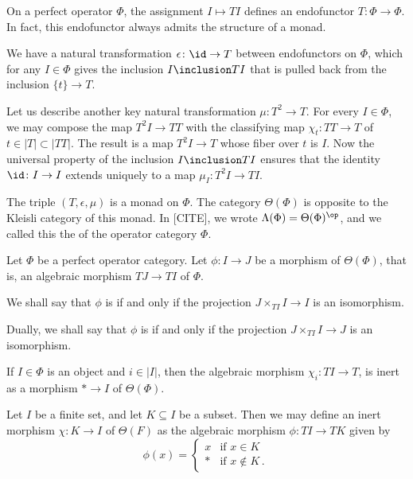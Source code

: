 \begin{nul}
	On a perfect operator $ \Phi $,
	the assignment $ I \mapsto TI $ defines an endofunctor
	$ T \colon \Phi \to \Phi $.
	In fact, this endofunctor always admits
	the structure of a monad.

	We have a natural transformation $ \epsilon \colon \id \to T $
	between endofunctors on $ \Phi $,
	which for any $ I \in \Phi $ gives
	the inclusion $ I \inclusion TI $
	that is pulled back from the inclusion $ \{t\} \to T $.

	Let us describe another key natural transformation
	$ \mu \colon T^2 \to T $.
	For every $ I \in \Phi $, we may compose the map $ T^2I \to TT $
	with the classifying map
	$ \chi_t \colon TT \to T $ of $ t \in |T| \subset |TT| $.
	The result is a map $ T^2I \to T $
	whose fiber over $ t $ is $ I $.
	Now the universal property of the inclusion $ I \inclusion TI $
	ensures that the identity $ \id \colon I \to I $
	extends uniquely to
	a map $ \mu_I \colon T^2 I \to TI $.

	The triple $ (T, \epsilon, \mu) $ is a monad on $ \Phi $.
	The category $ \Theta(\Phi) $ is opposite to
	the Kleisli category of this monad.
	In [CITE], we wrote $ \Lambda(\Phi) = \Theta(\Phi)^{\op} $, and
	we called this the 
	of the operator category $ \Phi $.
\end{nul}

\begin{definition}
	Let $ \Phi $ be a perfect operator category. 
	Let $ \phi \colon I \to J $ be a morphism of $ \Theta(\Phi) $,
	that is, an algebraic morphism $ TJ \to TI $ of $ \Phi $.
	
	We shall say that $ \phi $ is  if and only if
	the projection $ J \times_{TI} I \to I $ is an isomorphism.
	
	Dually, we shall say that $ \phi $ is
	 if and only if
	the projection $ J \times_{TI} I \to J $ is an isomorphism.
\end{definition}

\begin{eg}
	If $ I \in \Phi $ is an object and $ i \in |I| $,
	then the algebraic morphism $ \chi_i \colon TI \to T $,
	is inert as a morphism $ \ast \to I $ of $ \Theta(\Phi) $.
\end{eg}

\begin{eg}
	Let $ I $ be a finite set, and
	let $ K \subseteq I $ be a subset.
	Then we may define
	an inert morphism $ \chi \colon K \to I $ of $ \Theta(F) $
	as the algebraic morphism $ \phi \colon TI \to TK $ given by
	\[
		\phi(x) = \begin{cases}
			x & \text{if } x \in K \\
			\ast & \text{if } x \notin K \period
		\end{cases}
	\]	
\end{eg}

